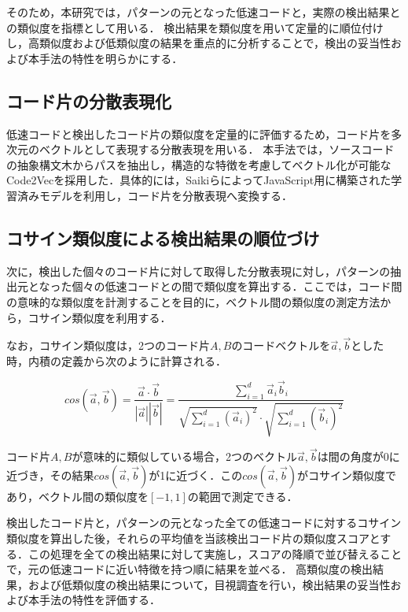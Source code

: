 \documentclass[11pt]{jreport}
\begin{document}
そのため，本研究では，パターンの元となった低速コードと，実際の検出結果との類似度を指標として用いる．
検出結果を類似度を用いて定量的に順位付けし，高類似度および低類似度の結果を重点的に分析することで，検出の妥当性および本手法の特性を明らかにする．


\subsection{コード片の分散表現化}

低速コードと検出したコード片の類似度を定量的に評価するため，コード片を多次元のベクトルとして表現する分散表現を用いる．
本手法では，ソースコードの抽象構文木からパスを抽出し，構造的な特徴を考慮してベクトル化が可能なCode2Vec\cite{code2vec}を採用した．具体的には，Saiki\cite{saiki_en}らによってJavaScript用に構築された学習済みモデルを利用し，コード片を分散表現へ変換する．


\subsection{コサイン類似度による検出結果の順位づけ}
\label{subsec:sort_cosine}

次に，検出した個々のコード片に対して取得した分散表現に対し，パターンの抽出元となった個々の低速コードとの間で類似度を算出する．ここでは，コード間の意味的な類似度を計測することを目的に，ベクトル間の類似度の測定方法から，コサイン類似度を利用する．

なお，コサイン類似度は，2つのコード片$A,B$のコードベクトルを$\overrightarrow{a},\overrightarrow{b}$とした時，内積の定義から次のように計算される．

\begin{displaymath}
	cos(\overrightarrow{a}, \overrightarrow{b}) = \frac{\overrightarrow{a} \cdot \overrightarrow{b}}{|\overrightarrow{a}||\overrightarrow{b}|}
	= \frac{\sum_{i=1}^d \overrightarrow{a}_{i} \overrightarrow{b}_{i}}{\sqrt{\sum_{i=1}^d (\overrightarrow{a}_{i})^2} \cdot \sqrt{\sum_{i=1}^d (\overrightarrow{b}_{i})^2}}
\end{displaymath}

コード片$A,B$が意味的に類似している場合，2つのベクトル$\overrightarrow{a},\overrightarrow{b}$は間の角度が0に近づき，その結果$cos(\overrightarrow{a}, \overrightarrow{b})$が1に近づく．この$cos(\overrightarrow{a}, \overrightarrow{b})$がコサイン類似度であり，ベクトル間の類似度を$[-1,1]$の範囲で測定できる．

検出したコード片と，パターンの元となった全ての低速コードに対するコサイン類似度を算出した後，それらの平均値を当該検出コード片の類似度スコアとする．この処理を全ての検出結果に対して実施し，スコアの降順で並び替えることで，元の低速コードに近い特徴を持つ順に結果を並べる．
高類似度の検出結果，および低類似度の検出結果について，目視調査を行い，検出結果の妥当性および本手法の特性を評価する．
\end{document}
